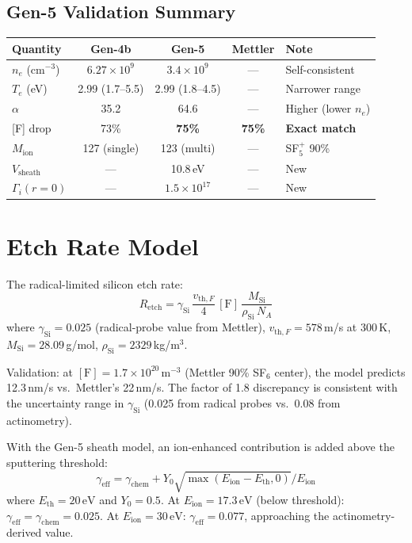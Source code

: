 \documentclass[11pt,a4paper]{article}
\renewcommand{\ne}{n_e}
\newcommand{\Te}{T_e}
\newcommand{\eV}{\,\mathrm{eV}}
\begin{document}
\subsection{Gen-5 Validation Summary}

\begin{center}
\begin{tabular}{lcccl}
\toprule
Quantity & Gen-4b & Gen-5 & Mettler & Note \\
\midrule
$\ne$ (cm$^{-3}$) & $6.27\times10^9$ & $3.4\times10^9$ & --- & Self-consistent \\
$\Te$ (eV) & 2.99 (1.7--5.5) & 2.99 (1.8--4.5) & --- & Narrower range \\
$\alpha$ & 35.2 & 64.6 & --- & Higher (lower $\ne$) \\
{[F]} drop & 73\% & \textbf{75\%} & \textbf{75\%} & \textbf{Exact match} \\
$M_{\mathrm{ion}}$ & 127 (single) & 123 (multi) & --- & SF$_5^+$ 90\% \\
$V_{\mathrm{sheath}}$ & --- & 10.8\,eV & --- & New \\
$\Gamma_i(r\!=\!0)$ & --- & $1.5\times10^{17}$ & --- & New \\
\bottomrule
\end{tabular}
\end{center}

\section{Etch Rate Model}
\label{sec:etch}

The radical-limited silicon etch rate:
\begin{equation}
\boxed{R_{\mathrm{etch}} = \gamma_{\mathrm{Si}}\,\frac{v_{\mathrm{th},F}}{4}\,[\mathrm{F}]\,\frac{M_{\mathrm{Si}}}{\rho_{\mathrm{Si}}\,N_A}}
\end{equation}
where $\gamma_{\mathrm{Si}} = 0.025$ (radical-probe value from Mettler), $v_{\mathrm{th},F} = 578$\,m/s at 300\,K, $M_{\mathrm{Si}} = 28.09$\,g/mol, $\rho_{\mathrm{Si}} = 2329$\,kg/m$^3$.

Validation: at $[\mathrm{F}] = 1.7\times10^{20}$\,m$^{-3}$ (Mettler 90\% SF$_6$ center), the model predicts 12.3\,nm/s vs.\ Mettler's 22\,nm/s.  The factor of 1.8 discrepancy is consistent with the uncertainty range in $\gamma_{\mathrm{Si}}$ (0.025 from radical probes vs.\ 0.08 from actinometry).

With the Gen-5 sheath model, an ion-enhanced contribution is added above the sputtering threshold:
\begin{equation}
\gamma_{\mathrm{eff}} = \gamma_{\mathrm{chem}} + Y_0\sqrt{\max(E_{\mathrm{ion}} - E_{\mathrm{th}}, 0)}/E_{\mathrm{ion}}
\end{equation}
where $E_{\mathrm{th}} = 20\eV$ and $Y_0 = 0.5$.  At $E_{\mathrm{ion}} = 17.3\eV$ (below threshold): $\gamma_{\mathrm{eff}} = \gamma_{\mathrm{chem}} = 0.025$.  At $E_{\mathrm{ion}} = 30\eV$: $\gamma_{\mathrm{eff}} = 0.077$, approaching the actinometry-derived value.
\end{document}
